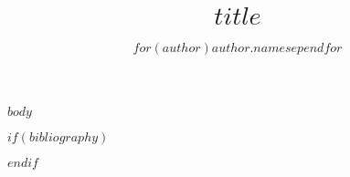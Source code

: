 \documentclass[letterpaper]{article}
\title{$title$}
\author{$for(author)$$author.name$$sep$\quad $endfor$}
\date{}
\begin{document}
\maketitle
\setnowidow[2]

$body$

$if(bibliography)$


$endif$
\end{document}
